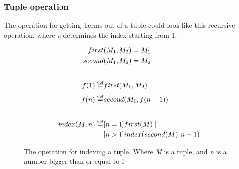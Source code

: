 \subsubsection{Tuple operation}
The operation for getting Terms out of a tuple could look like this recursive operation, where \textit{n} determines the index starting from 1.
\begin{figure}[h]
    \begin{center}
        \begin{align*}
            first&(M_1, M_2) = M_1\\
            second&(M_1, M_2) = M_2\\
            \\
            f(1) \overset{\underset{\mathrm{def}}{}}{=} & first(M_1, M_2)\\
            f(n) \overset{\underset{\mathrm{def}}{}}{=} & second(M_1, f(n-1))\\
            \\
            index(M, n) \overset{\underset{\mathrm{def}}{}}{=} &[n = 1]first(M)\mid \\
            &[n > 1]index(second(M), n-1)
        \end{align*}
    \end{center}
    \caption{The operation for indexing a tuple. Where \textit{M} is a tuple, and \textit{n} is a number bigger than  or equal to 1}
\end{figure}
\FloatBarrier
